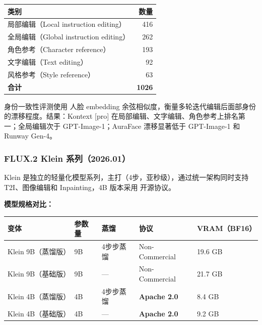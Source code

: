 \begin{center}
\begin{tabular}{lr}
\toprule
\textbf{类别} & \textbf{数量} \\
\midrule
局部编辑（Local instruction editing） & 416 \\
全局编辑（Global instruction editing） & 262 \\
角色参考（Character reference）        & 193 \\
文字编辑（Text editing）               & 92 \\
风格参考（Style reference）            & 63 \\
\midrule
\textbf{合计} & \textbf{1026} \\
\bottomrule
\end{tabular}
\end{center}

身份一致性评测使用  人脸 embedding 余弦相似度，衡量多轮迭代编辑后面部身份的漂移程度。结果：Kontext [pro] 在局部编辑、文字编辑、角色参考上排名第一；全局编辑次于 GPT-Image-1；AuraFace 漂移显著低于 GPT-Image-1 和 Runway Gen-4。

\subsubsection{FLUX.2 Klein 系列（2026.01）}

\begin{intubox}
Klein 是独立的轻量化模型系列，主打（4步，亚秒级），通过统一架构同时支持 T2I、图像编辑和 Inpainting，4B 版本采用  开源协议。
\end{intubox}

\textbf{模型规格对比：}

\begin{center}
\begin{tabular}{lllll}
\toprule
\textbf{变体} & \textbf{参数量} & \textbf{蒸馏} & \textbf{协议} & \textbf{VRAM（BF16）} \\
\midrule
Klein 9B（蒸馏版） & 9B  & 4步步蒸馏 & Non-Commercial & 19.6 GB \\
Klein 9B（基础版） & 9B  & —          & Non-Commercial & 21.7 GB \\
Klein 4B（蒸馏版） & 4B  & 4步步蒸馏 & \textbf{Apache 2.0} & 8.4 GB \\
Klein 4B（基础版） & 4B  & —          & \textbf{Apache 2.0} & 9.2 GB \\
\bottomrule
\end{tabular}
\end{center}

